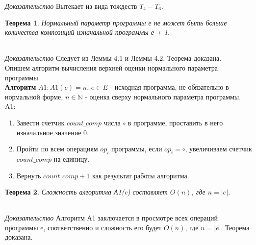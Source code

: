 \documentclass[12pt]{article}
\newtheorem{thm}{Теорема}[section]
\begin{document}
\emph{Доказательство} Вытекает из вида тождеств $T_{4}-T_{6}$.\\
\begin{thm} Нормальный параметр программы е не может быть больше количества композиций изначальной программы е + 1.\end{thm}\\
\emph{Доказательство} Следует из Леммы 4.1 и Леммы 4.2. Теорема доказана.\\
Опишем алгоритм вычисления верхней оценки нормального параметра программы.\\
\textbf{Алгоритм} $A1: A1(e) = n$, $e \in E$ - исходная программа, не обязательно в нормальной форме, $n \in \mathbb{N}$ - оценка сверху нормального параметра программы.\\
A1:\\
\begin{enumerate}
\item Завести счетчик $count\_comp$ числа $\circ$ в программе, проставить в него изначальное значение 0.
\item Пройти по всем операциям $op_{i}$ программы, если $op_{i} = \circ$, увеличиваем счетчик $count\_comp$ на единицу.
\item Вернуть $count\_comp + 1$ как результат работы алгоритма.
\end{enumerate}
\begin{thm} Сложность алгоритма А1(e) составляет $O(n)$, где $n = |e|$.\end{thm}\\
\emph{Доказательство} Алгоритм А1 заключается в просмотре всех операций программы e, соответственно и сложность его будет $O(n)$, где $n = |e|$. Теорема доказана.\\
\pagebreak
\end{document}
